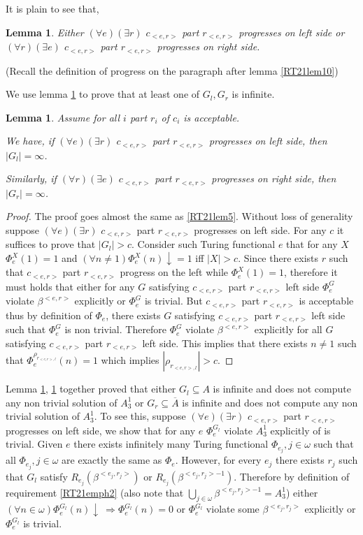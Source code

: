 \documentclass[options]{amsart}
\newtheorem{lemma}[theorem]{Lemma}
\theoremstyle{definition}
\theoremstyle{remark}
\newtheorem{Ramsey's theorem}[theorem]{Ramsey's theorem}
\begin{document}
It is plain to see that,
\begin{lemma}\label{RT21lem7}
Either
$(\forall e)(
\exists r)$ $c_{<e,r>}$ part
$r_{<e,r>}$ progresses on left side
or
$(\forall r)(
\exists e)$ $c_{<e,r>}$ part
$r_{<e,r>}$ progresses on right side.

\end{lemma}
(Recall the definition of progress on the
paragraph after lemma \ref{RT21lem10})

We use lemma \ref{RT21lem7}
to prove that at least one of
$G_l,G_r$ is infinite.
\begin{lemma}\label{RT21lem8}
Assume for all $i$
part $r_i$ of $c_i$
is acceptable.

We have, if
$(\forall e)(
\exists r)$ $c_{<e,r>}$ part
$r_{<e,r>}$ progresses on left side,
 then
$|G_l|=\infty$.

Similarly,
if
$(\forall r)(
\exists e)$ $c_{<e,r>}$ part
$r_{<e,r>}$ progresses on right side,
 then
$|G_r|=\infty$.

\end{lemma}
\begin{proof}
The proof goes almost the same
as \ref{RT21lem5}. 
Without loss of generality
suppose $(\forall e)(
\exists r)$ $c_{<e,r>}$ part
$r_{<e,r>}$ progresses on left side.
For any $c$ it suffices to prove that 
$|G_l|>c$.
Consider such Turing functional
$e$ that for any $X$ 
$\Phi_e^X(1)= 1$ and 
$(\forall n\ne 1)\Phi_e^X(n)\downarrow=1$ iff
$|X|>c$. Since 
there exists $r$ such that
$c_{<e,r>}$ part $r_{<e,r>}$ 
progress on the left
while $\Phi_e^X(1)= 1$,
therefore it must holds that 
either for any $G$ satisfying
$c_{<e,r>}$ part
$r_{<e,r>}$ left side $\Phi_e^G$
violate $\beta^{<e,r>}$ explicitly
or $\Phi_e^G$ is trivial.
But $c_{<e,r>}$ part $r_{<e,r>}$
is acceptable thus by definition
of $\Phi_e$, there exists
$G$ satisfying
$c_{<e,r>}$ part $r_{<e,r>}$ left side
such that
$\Phi_e^G$ is non trivial.
Therefore $\Phi_e^G$
violate $\beta^{<e,r>}$ explicitly
for all $G$ satisfying
$c_{<e,r>}$ part $r_{<e,r>}$ left side.
This implies that there exists
$n\ne 1$ such that $\Phi_e^{\rho_{r_{<e,r>,l}}}
(n)=1$ which implies $|\rho_{r_{<e,r>,l}}|>c$.

\end{proof}
Lemma \ref{RT21lem7}, \ref{RT21lem8}
together proved that either
$G_l\subseteq A$ is infinite and
does not compute any non trivial
solution of $A_3^1$
or
$G_r\subseteq \overline{A}$ is infinite and
does not compute any non trivial
solution of $A_3^1$.
To see this, suppose
$(\forall e)(
\exists r)$ $c_{<e,r>}$ part
$r_{<e,r>}$ progresses on left side,
we show that for any $e$ 
$\Phi_e^{G_l}$ violate
$A_3^1$ explicitly of is trivial.
Given $e$ there exists infinitely many
Turing functional $\Phi_{e_j},j\in\omega$
such that all $\Phi_{e_j}, j\in\omega$
are exactly the same as $\Phi_e$.
However, for every $e_j$
there exists
$r_j$  such that $G_l$ satisfy 
$R_{e_j}(\beta^{<e_j,r_j>})$
or $R_{e_j}(\beta^{<e_j,r_j>-1})$.
Therefore by definition of requirement
\ref{RT21emph2}
(also note that $\bigcup\limits_{j\in\omega}
\beta^{<e_j,r_j>-1}=A_3^1$)
 either
$(\forall n\in\omega)\Phi_e^{G_l}(n)\downarrow\
\Rightarrow \Phi_e^{G_l}(n)=0$ or 
$\Phi_e^{G_l}$ violate some $\beta^{<e_j,r_j>}$
explicitly or $\Phi_e^{G_l}$ is trivial.
\end{document}

